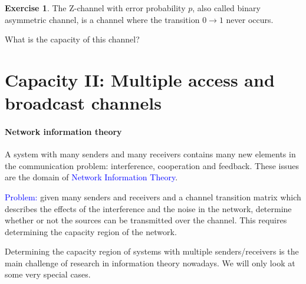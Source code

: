 \documentclass[a4paper, 11pt, openany]{book}
\numberwithin{equation}{section}
\theoremstyle{plain}
\theoremstyle{definition}
\newtheorem{exercise}   {Exercise}  [section]
\newcommand{\Structure}[1]{\textcolor{blue}{#1}}
\begin{document}
\begin{exercise}
The Z-channel with error probability $p$, also called binary asymmetric channel, is a channel where the transition $0 \to 1$ never occurs.

\begin{center}
\end{center}

What is the capacity of this channel?
\end{exercise}














\section{Capacity II: Multiple access and broadcast channels}
\label{sec:34}

\paragraph{Network information theory}
A system with many senders and many receivers contains many new elements in the communication problem: interference, cooperation and feedback. These issues are the domain of \Structure{Network Information Theory}.

\Structure{Problem:} given many senders and receivers and a channel transition matrix which describes the effects of the interference and the noise in the network, determine whether or not the sources can be transmitted over the channel. This requires determining the capacity region of the network.

Determining the capacity region of systems with multiple senders/receivers is the main challenge of research in information theory nowadays. We will only look at some very special cases.
\end{document}

